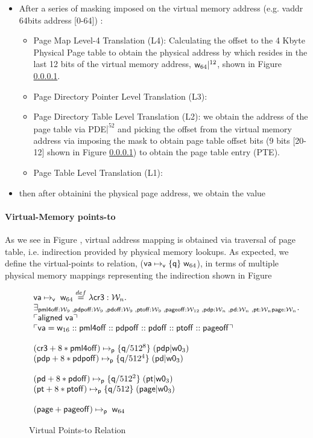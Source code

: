 \begin{itemize}
\item  After a series of masking imposed on the virtual memory address (e.g. \textsf{vaddr} 64bits address [0-64]) :
  \begin{itemize}
  \item Page Map Level-4 Translation (L4): Calculating the offset to the 4 \textsf{Kbyte Physical Page} table to obtain the  physical address by  which resides in the last 12 bits of the virtual memory address, $\mathsf{w}_{64}|^{12}$,  shown in Figure \ref{}.  
  \item Page Directory Pointer Level Translation (L3):
  \item Page Directory Table Level Translation (L2):  we obtain the address of the page table via \textsf{PDE}$|^{52}$ and picking the offset from the virtual memory address via imposing the mask to obtain page table offset bits (9 bits [20-12] shown in Figure \ref{}) to obtain the page table entry (\textsf{PTE}).
  \item Page Table Level Translation (L1): 
  \end{itemize}
 \item then after obtainini the physical page address, we obtain the value 
\end{itemize}


\paragraph{Virtual-Memory points-to} As we see in Figure , virtual address mapping is obtained via traversal of page table, i.e. indirection provided by physical memory lookups. As expected, we define the virtual-points to relation, ($\mathsf{va}\mapsto_{\mathsf{v}}\{\mathsf{q}\}\;\mathsf{w}_{64}$), in terms of multiple physical memory mappings representing the indirection shown in Figure 
\begin{figure*}
\[
\begin{array}{l}
  \mathsf{va}\mapsto_{\mathsf{v}}\;\mathsf{w}_{64} \stackrel{def}{=} \lambda \mathsf{cr3}:\mathcal{W}_n.\\
  \exists_{\mathsf{pml4off}:\mathcal{W}_{9} \;, \mathsf{pdpoff}:\mathcal{W}_{9} \;, \mathsf{pdoff}:\mathcal{W}_{9} \;,\mathsf{ptoff}:\mathcal{W}_{9} \;, \mathsf{pageoff}:\mathcal{W}_{12} \;, \mathsf{pdp}:\mathcal{W}_n \;, \mathsf{pd}:\mathcal{W}_n \;, \mathsf{pt}:\mathcal{W}_n \mathsf{page}:\mathcal{W}_n} \ldotp \\
  \ulcorner \textsf{aligned } \mathsf{va} \urcorner \\ 
   \ulcorner \mathsf{va} = \mathsf{w}_{16} :: \mathsf{pml4off} :: \mathsf{pdpoff} :: 
   \mathsf{pdoff} :: \mathsf{ptoff} :: \mathsf{pageoff} \urcorner \\\\
  (\mathsf{cr3}+8*\mathsf{pml4off})\mapsto_{\mathsf{p}}\{\mathsf{q}/512^{8}\}\;(\mathsf{pdp} | \mathsf{w0}_{3}) \\ 
  (\mathsf{pdp}+8*\mathsf{pdpoff})\mapsto_{\mathsf{p}}\{\mathsf{q}/512^{4}\}\;(\mathsf{pd} | \mathsf{w0}_{3}) \\ \\
  (\mathsf{pd}+8*\mathsf{pdoff})\mapsto_{\mathsf{p}}\{\mathsf{q}/512^{2}\}\;(\mathsf{pt} | \mathsf{w0}_{3}) \\ 
  (\mathsf{pt}+8*\mathsf{ptoff})\mapsto_{\mathsf{p}}\{\mathsf{q}/512\}\;(\mathsf{page} | \mathsf{w0}_{3}) \\ \\
  (\mathsf{page}+\mathsf{pageoff})\mapsto_{\mathsf{p}}\;\mathsf{w}_{64} 
\end{array}
\]
\caption{Virtual Points-to Relation}
  \label{fig:virtualpointsto}
\end{figure*}
